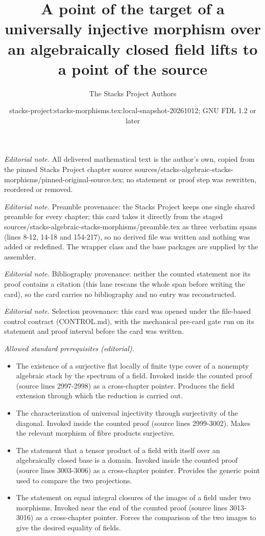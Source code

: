 \documentclass[10pt,a4paper]{amsart}
\title{A point of the target of a universally injective morphism over an algebraically closed field lifts to a point of the source}
\author{The Stacks Project Authors}
\date{stacks-project:stacks-morphisms.tex:local-snapshot-20261012; GNU FDL 1.2 or later}
\theoremstyle{plain}
\theoremstyle{definition}
\theoremstyle{remark}
\numberwithin{equation}{subsection}
\begin{document}
\maketitle
\noindent\textit{Editorial note.} All delivered mathematical text is the author's own, copied from the pinned Stacks Project chapter source sources/stacks-algebraic-stacks-morphisms/pinned-original-source.tex; no statement or proof step was rewritten, reordered or removed.\par\medskip
\noindent\textit{Editorial note.} Preamble provenance: the Stacks Project keeps one single shared preamble for every chapter; this card takes it directly from the staged sources/stacks-algebraic-stacks-morphisms/preamble.tex as three verbatim spans (lines 8-12, 14-18 and 154-217), so no derived file was written and nothing was added or redefined. The wrapper class and the base packages are supplied by the assembler.\par\medskip
\noindent\textit{Editorial note.} Bibliography provenance: neither the counted statement nor its proof contains a citation (this lane rescans the whole span before writing the card), so the card carries no bibliography and no entry was reconstructed.\par\medskip
\noindent\textit{Editorial note.} Selection provenance: this card was opened under the file-based control contract (CONTROL.md), with the mechanical pre-card gate run on its statement and proof interval before the card was written.\par\medskip
\noindent\textit{Allowed standard prerequisites (editorial).}\begin{itemize}
\item The existence of a surjective flat locally of finite type cover of a nonempty algebraic stack by the spectrum of a field. Invoked inside the counted proof (source lines 2997-2998) as a cross-chapter pointer. Produces the field extension through which the reduction is carried out.
\item The characterization of universal injectivity through surjectivity of the diagonal. Invoked inside the counted proof (source lines 2999-3002). Makes the relevant morphism of fibre products surjective.
\item The statement that a tensor product of a field with itself over an algebraically closed base is a domain. Invoked inside the counted proof (source lines 3003-3006) as a cross-chapter pointer. Provides the generic point used to compare the two projections.
\item The statement on equal integral closures of the images of a field under two morphisms. Invoked near the end of the counted proof (source lines 3013-3016) as a cross-chapter pointer. Forces the comparison of the two images to give the desired equality of fields.
\end{itemize}\medskip
\end{document}
